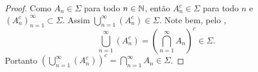 \begin{proof}
    Como $A_n\in \Sigma$ para todo $n\in \mathbb{N}$, então $A_n^{c}\in \Sigma$ para todo $n$ e $\left(A_n^{c}\right)_{n=1}^\infty \subset \Sigma$. Assim $\bigcup_{n=1}^\infty \left( A_n^{c} \right)\in \Sigma$. Note bem, pelo , 
    \begin{equation*}
        \bigcup_{n=1}^\infty \left( A_n^{c} \right) = \left( \bigcap_{n=1}^{\infty} A_n \right)^{c} \in \Sigma.
    \end{equation*}
    Portanto $\left(\bigcup_{n=1}^\infty \left( A_n^{c} \right)\right)^{c} = \bigcap_{n=1}^{\infty} A_n \in \Sigma$.
\end{proof}